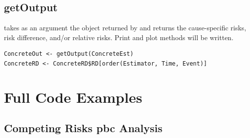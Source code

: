 \documentclass{report}
\newcommand{\1}{\ensuremath{\mathbf{1}}}
\begin{document}
\subsection{getOutput}
\label{getoutput}
 takes as an argument the  object returned by  and returns the cause-specific risks, risk difference, and/or relative risks. Print and plot methods will be written.

\begin{lstlisting}
ConcreteOut <- getOutput(ConcreteEst)
ConcreteRD <- ConcreteRD$RD[order(Estimator, Time, Event)]
\end{lstlisting}


\section{Full Code Examples}
\label{sec:org3cfc394}
\subsection{Competing Risks pbc Analysis}
\label{sec:orgdba0dae}
\end{document}
